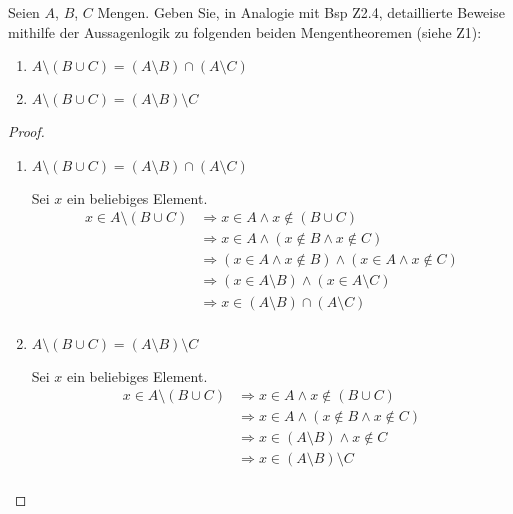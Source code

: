 \documentclass{../problemset}
\author{Michael van Straten}
\begin{document}
\maketitle

\begin{problem}
Seien $A$, $B$, $C$ Mengen. Geben Sie, in Analogie mit Bsp Z2.4, detaillierte Beweise mithilfe der Aussagenlogik zu folgenden beiden Mengentheoremen (siehe Z1):
\begin{enumerate}
	\item $A \setminus (B \cup C) = (A \setminus B) \cap (A \setminus C)$
	\item $A \setminus (B \cup C) = (A \setminus B) \setminus C$
\end{enumerate}
\begin{proof}
	\begin{enumerate}
		\item $A \setminus (B \cup C) = (A \setminus B) \cap (A \setminus C)$

		      Sei $x$ ein beliebiges Element.
		      \begin{align*}
			      x \in A \setminus (B \cup C) & \Longrightarrow x \in A \land x \not \in (B \cup C)                             \\
			                                   & \Longrightarrow x \in A \land (x \not \in B \land x \not \in C)                 \\
			                                   & \Longrightarrow (x \in A \land x \not \in B) \land (x \in A \land x \not \in C) \\
			                                   & \Longrightarrow (x \in A \setminus B) \land (x \in A \setminus C)               \\
			                                   & \Longrightarrow x \in (A \setminus B) \cap (A \setminus C) \tag{\checkmark}     \\
		      \end{align*}

		\item $A \setminus (B \cup C) = (A \setminus B) \setminus C$

		      Sei $x$ ein beliebiges Element.
		      \begin{align*}
			      x \in A \setminus (B \cup C) & \Longrightarrow x \in A \land x \not\in (B \cup C)                 \\
			                                   & \Longrightarrow x \in A \land (x \not\in B \land x \not\in C)      \\
			                                   & \Longrightarrow x \in (A \setminus B) \land x \not\in C            \\
			                                   & \Longrightarrow x \in (A \setminus B) \setminus C \tag{\checkmark} \\
		      \end{align*}
	\end{enumerate}
\end{proof}
\end{problem}
\end{document}
